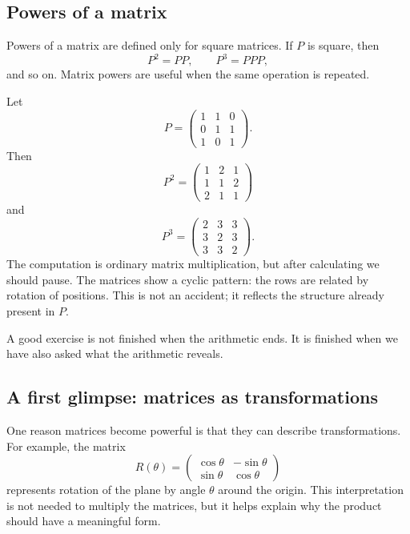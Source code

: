 \subsection{Powers of a matrix}

Powers of a matrix are defined only for square matrices. If \(P\) is square, then
\[
P^2=PP,
\qquad
P^3=PPP,
\]
and so on. Matrix powers are useful when the same operation is repeated.

\begin{examplebox}
Let
\[
P=\begin{pmatrix}
1 & 1 & 0\\
0 & 1 & 1\\
1 & 0 & 1
\end{pmatrix}.
\]
Then
\[
P^2=
\begin{pmatrix}
1 & 2 & 1\\
1 & 1 & 2\\
2 & 1 & 1
\end{pmatrix}
\]
and
\[
P^3=
\begin{pmatrix}
2 & 3 & 3\\
3 & 2 & 3\\
3 & 3 & 2
\end{pmatrix}.
\]
The computation is ordinary matrix multiplication, but after calculating we should pause. The matrices show a cyclic pattern: the rows are related by rotation of positions. This is not an accident; it reflects the structure already present in \(P\).
\end{examplebox}

A good exercise is not finished when the arithmetic ends. It is finished when we have also asked what the arithmetic reveals.

\subsection{A first glimpse: matrices as transformations}

One reason matrices become powerful is that they can describe transformations. For example, the matrix
\[
R(\theta)=
\begin{pmatrix}
\cos\theta & -\sin\theta\\
\sin\theta & \cos\theta
\end{pmatrix}
\]
represents rotation of the plane by angle \(\theta\) around the origin. This interpretation is not needed to multiply the matrices, but it helps explain why the product should have a meaningful form.

